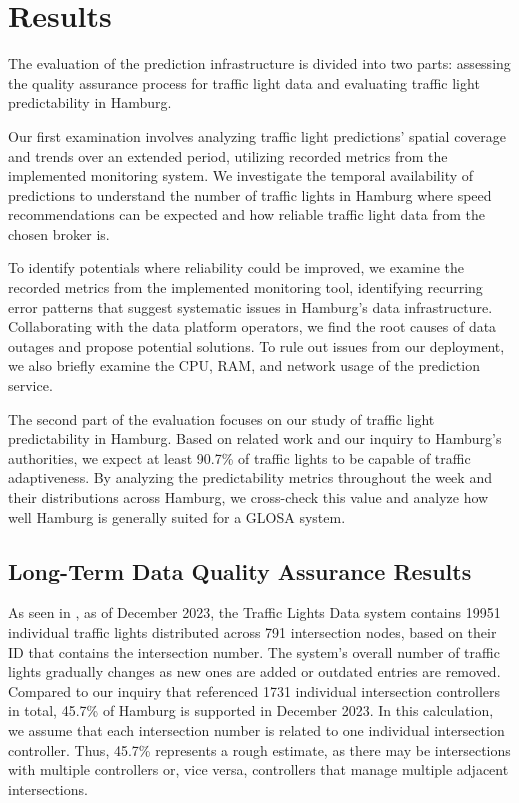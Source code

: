 \section{Results}

The evaluation of the prediction infrastructure is divided into two parts: assessing the quality assurance process for traffic light data and evaluating traffic light predictability in Hamburg.

Our first examination involves analyzing traffic light predictions' spatial coverage and trends over an extended period, utilizing recorded metrics from the implemented monitoring system. We investigate the temporal availability of predictions to understand the number of traffic lights in Hamburg where speed recommendations can be expected and how reliable traffic light data from the chosen broker is. 

To identify potentials where reliability could be improved, we examine the recorded metrics from the implemented monitoring tool, identifying recurring error patterns that suggest systematic issues in Hamburg's data infrastructure. Collaborating with the data platform operators, we find the root causes of data outages and propose potential solutions. To rule out issues from our deployment, we also briefly examine the CPU, RAM, and network usage of the prediction service.

The second part of the evaluation focuses on our study of traffic light predictability in Hamburg. Based on related work and our inquiry to Hamburg's authorities, we expect at least 90.7\% of traffic lights to be capable of traffic adaptiveness. By analyzing the predictability metrics throughout the week and their distributions across Hamburg, we cross-check this value and analyze how well Hamburg is generally suited for a GLOSA system.

\subsection{Long-Term Data Quality Assurance Results}

As seen in , as of December 2023, the Traffic Lights Data system contains 19951 individual traffic lights distributed across 791 intersection nodes, based on their ID that contains the intersection number. The system's overall number of traffic lights gradually changes as new ones are added or outdated entries are removed. Compared to our inquiry that referenced 1731 individual intersection controllers in total, 45.7\% of Hamburg is supported in December 2023. In this calculation, we assume that each intersection number is related to one individual intersection controller. Thus, 45.7\% represents a rough estimate, as there may be intersections with multiple controllers or, vice versa, controllers that manage multiple adjacent intersections.

